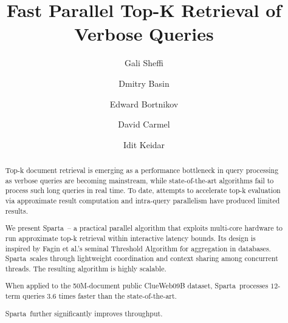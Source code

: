 \documentclass[sigconf,review,anonymous]{acmart}
\title{Fast Parallel Top-K Retrieval of Verbose Queries}
\author{Gali Sheffi}%
\author{Dmitry Basin}%
\author{Edward Bortnikov}%
\author{David Carmel}%
\author{Idit Keidar}%
\newcommand{\alg}{Sparta}
\newcommand{\bigdataset}[1]{} %
\begin{document}
\begin{abstract}
Top-k document retrieval is emerging as a performance bottleneck in query processing as verbose queries are becoming 
mainstream, while state-of-the-art algorithms fail to process such long queries in real time. To date, attempts to
accelerate top-k evaluation 
via approximate result computation and intra-query parallelism have produced limited results. 

We present \alg\ -- a practical parallel algorithm that exploits multi-core hardware to run approximate top-k retrieval 
within interactive latency bounds. Its design is inspired by  Fagin et al.'s seminal Threshold Algorithm for  aggregation in databases. 
\alg\ scales through lightweight coordination and context sharing among concurrent threads. The resulting algorithm 
is highly scalable.
\bigdataset{ 
both in the number of query terms and in the searched index size. 
}
When applied to the 50M-document public ClueWeb09B 
dataset, \alg\  processes $12$-term queries $3.6$ times faster than the state-of-the-art. 
\bigdataset{
On a tenfold  bigger index, 
\alg\ continues to process queries at the same speed, whereas today's best-in-class algorithm is more than 60 times slower. 
}
\alg\ further significantly improves throughput.%
\end{abstract}


\maketitle








\clearpage

  
\end{document}
